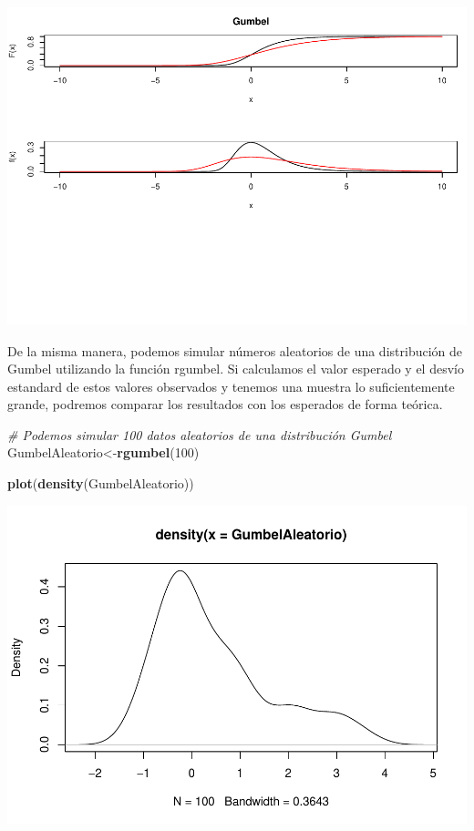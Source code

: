 \documentclass[
  12pt]{article}
\newenvironment{Shaded}{\begin{snugshade}}{\end{snugshade}}
\newcommand{\CommentTok}[1]{\textcolor[rgb]{0.56,0.35,0.01}{\textit{#1}}}
\newcommand{\DecValTok}[1]{\textcolor[rgb]{0.00,0.00,0.81}{#1}}
\newcommand{\FunctionTok}[1]{\textcolor[rgb]{0.13,0.29,0.53}{\textbf{#1}}}
\newcommand{\NormalTok}[1]{#1}
\newcommand{\OtherTok}[1]{\textcolor[rgb]{0.56,0.35,0.01}{#1}}
\begin{document}
\includegraphics{extremales_files/figure-latex/unnamed-chunk-12-1.pdf}

De la misma manera, podemos simular números aleatorios de una
distribución de Gumbel utilizando la función rgumbel. Si calculamos el
valor esperado y el desvío estandard de estos valores observados y
tenemos una muestra lo suficientemente grande, podremos comparar los
resultados con los esperados de forma teórica.

\begin{Shaded}
\begin{Highlighting}[]
\CommentTok{\# Podemos simular 100 datos aleatorios de una distribución Gumbel}
\NormalTok{GumbelAleatorio}\OtherTok{\textless{}{-}}\FunctionTok{rgumbel}\NormalTok{(}\DecValTok{100}\NormalTok{)}

\FunctionTok{plot}\NormalTok{(}\FunctionTok{density}\NormalTok{(GumbelAleatorio))}
\end{Highlighting}
\end{Shaded}

\includegraphics{extremales_files/figure-latex/unnamed-chunk-13-1.pdf}
\end{document}
